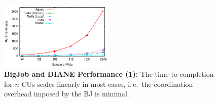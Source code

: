 \documentclass[conference,final]{IEEEtran}
\makeatletter
\def\reduwave{\bgroup \markoverwith{\lower3.5\p@\hbox{\sixly \textcolor{red}{\char58}}}\ULon}
\newcommand{\jwave}[1]{ {\reduwave{#1}}}
\newcommand{\jhanote}[1]{ {\textcolor{red} { ***shantenu: #1 }}}
\newcommand{\alnote}[1]{ {\textcolor{blue} { ***andreL: #1 }}}
\newcommand{\jwave}[1]{#1}
\newcommand{\alnote}[1]{}
\newcommand{\jhanote}[1]{}
\newcommand{\cu}{CU\xspace}
\newcommand{\cus}{CUs\xspace}
\newcommand{\upp}{\vspace*{-0.5em}}
\makeatother
\begin{document}







\begin{figure}[htbp] \centering
\includegraphics[width=0.49\textwidth]{perf/bigjob-varying-wus-alamo.pdf}
\caption{\textbf{BigJob and DIANE Performance (1):} The 
time-to-completion for $n$ \cus scales linearly
in most cases, i.\,e.\ the coordination overhead imposed by the BJ is 
minimal.\upp\upp}
\label{fig:perf_bigjob-varying-wus} \end{figure}
\end{document}
